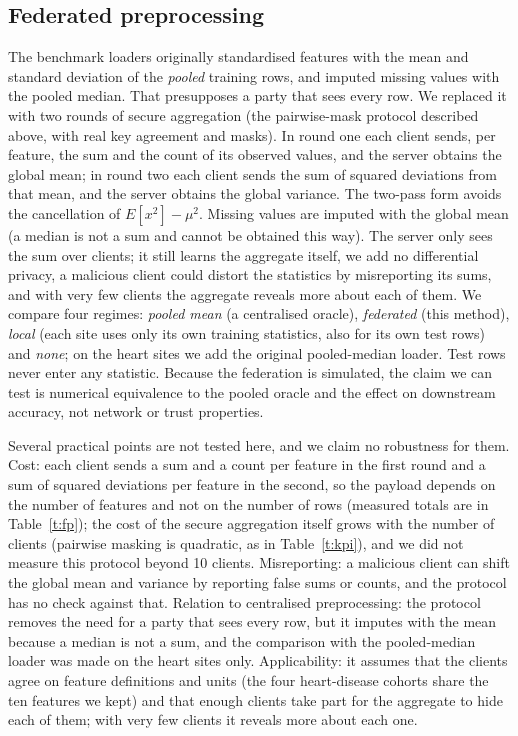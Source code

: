\documentclass[conference]{IEEEtran}
\begin{document}
\subsection{Federated preprocessing}
\label{sec:fp-method}
The benchmark loaders originally standardised features with the mean and standard deviation of the \emph{pooled} training rows, and imputed missing values with the pooled median. That presupposes a party that sees every row. We replaced it with two rounds of secure aggregation (the pairwise-mask protocol described above, with real key agreement and masks). In round one each client sends, per feature, the sum and the count of its observed values, and the server obtains the global mean; in round two each client sends the sum of squared deviations from that mean, and the server obtains the global variance. The two-pass form avoids the cancellation of $E[x^2]-\mu^2$. Missing values are imputed with the global mean (a median is not a sum and cannot be obtained this way). The server only sees the sum over clients; it still learns the aggregate itself, we add no differential privacy, a malicious client could distort the statistics by misreporting its sums, and with very few clients the aggregate reveals more about each of them. We compare four regimes: \emph{pooled mean} (a centralised oracle), \emph{federated} (this method), \emph{local} (each site uses only its own training statistics, also for its own test rows) and \emph{none}; on the heart sites we add the original pooled-median loader. Test rows never enter any statistic. Because the federation is simulated, the claim we can test is numerical equivalence to the pooled oracle and the effect on downstream accuracy, not network or trust properties.

Several practical points are not tested here, and we claim no robustness for them. Cost: each client sends a sum and a count per feature in the first round and a sum of squared deviations per feature in the second, so the payload depends on the number of features and not on the number of rows (measured totals are in Table~\ref{t:fp}); the cost of the secure aggregation itself grows with the number of clients (pairwise masking is quadratic, as in Table~\ref{t:kpi}), and we did not measure this protocol beyond 10 clients. Misreporting: a malicious client can shift the global mean and variance by reporting false sums or counts, and the protocol has no check against that. Relation to centralised preprocessing: the protocol removes the need for a party that sees every row, but it imputes with the mean because a median is not a sum, and the comparison with the pooled-median loader was made on the heart sites only. Applicability: it assumes that the clients agree on feature definitions and units (the four heart-disease cohorts share the ten features we kept) and that enough clients take part for the aggregate to hide each of them; with very few clients it reveals more about each one.
\end{document}
